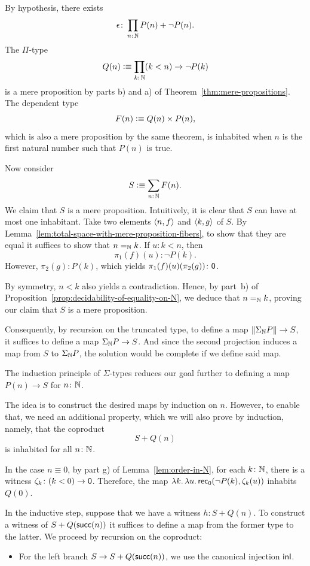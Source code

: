 \begin{solution}
    By hypothesis, there exists
    \[
        \epsilon\colon\prod_{n\colon\N}P(n)+\neg P(n).
    \]
    The $\Pi$-type
    \[
        Q(n)\defeq\prod_{k\colon\N}(k<n)\to\neg P(k)
    \]
    is a mere proposition by parts b) and a) of Theorem~\ref{thm:mere-propositions}.
    The dependent type
    \[
        F(n)\mathrel{\vcentcolon}\equiv Q(n)\times P(n),
    \]
    which is also a mere proposition by the same theorem, is inhabited when $n$ is the first natural number such that $P(n)$ is true.

    Now consider
    \[
        S\defeq\sum_{n\colon\N}F(n).
    \]
    We claim that $S$ is a mere proposition. Intuitively, it is clear that $S$ can have at most one inhabitant. Take two elements $\langle n,f\rangle$ and $\langle k,g\rangle$ of $S$. By Lemma~\ref{lem:total-space-with-mere-proposition-fibers}, to show that they are equal it suffices to show that $n\mathrel{=_{\mathbb{N}}} k$. If $u\colon k<n$, then
    \[
        \pi_1(f)(u)\colon\neg P(k).
    \]
    However, $\pi_2(g)\colon P(k)$, which yields $\pi_1(f)(u)(\pi_2(g))\colon\fun0$.

    By symmetry, $n<k$ also yields a contradiction. Hence, by part~b) of Proposition~\ref{prop:decidability-of-equality-on-N}, we deduce that $n\mathrel{=_{\mathbb{N}}} k$, proving our claim that $S$ is a mere proposition.

    Consequently, by recursion on the truncated type, to define a map $\lVert\Sigma_{\mathbb{N}} P\rVert\to S$, it suffices to define a map $\Sigma_{\mathbb{N}} P\to S$. And since the second projection induces a map from $S$ to $\Sigma_{\mathbb{N}} P$, the solution would be complete if we define said map.
    
    The induction principle of $\Sigma$-types reduces our goal further to defining a map $P(n)\to S$ for $n\colon\N$.

    The idea is to construct the desired maps by induction on $n$. However, to enable that, we need an additional property, which we will also prove by induction, namely, that the coproduct
    \[
        S+Q(n)
    \]
    is inhabited for all $n\colon\N$.

    In the case $n\equiv0$, by part g) of Lemma~\ref{lem:order-in-N}, for each $k\colon\N$, there is a witness $\zeta_k\colon(k<0)\to\fun0$. Therefore, the map $\lambda k.\,\lambda u.\,\mathsf{rec}_{\mathsf{0}}(\neg P(k),\zeta_k(u))$ inhabits $Q(0)$.

    In the inductive step, suppose that we have a witness $h\colon S+Q(n)$. To construct a witness of $S+Q(\mathsf{succ}(n))$ it suffices to define a map from the former type to the latter. We proceed by recursion on the coproduct:
    \begin{itemize}
        \item For the left branch $S\to S+Q(\mathsf{succ}(n))$, we use the canonical injection $\mathsf{inl}$.


\end{itemize}
\end{solution}
